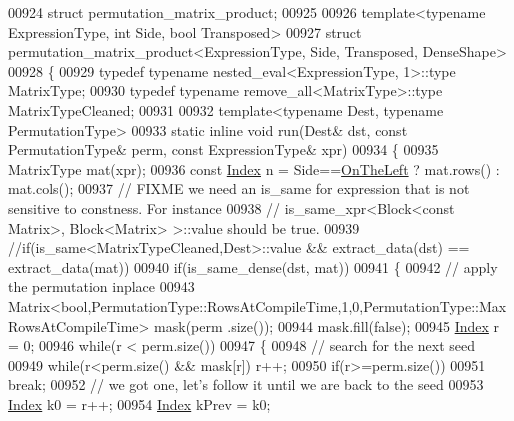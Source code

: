 \begin{DoxyCode}
00924 \textcolor{keyword}{struct }permutation\_matrix\_product;
00925 
00926 \textcolor{keyword}{template}<\textcolor{keyword}{typename} ExpressionType, \textcolor{keywordtype}{int} S\textcolor{keywordtype}{id}e, \textcolor{keywordtype}{bool} Transposed>
00927 \textcolor{keyword}{struct }permutation\_matrix\_product<ExpressionType, Side, Transposed, DenseShape>
00928 \{
00929     \textcolor{keyword}{typedef} \textcolor{keyword}{typename} nested\_eval<ExpressionType, 1>::type MatrixType;
00930     \textcolor{keyword}{typedef} \textcolor{keyword}{typename} remove\_all<MatrixType>::type MatrixTypeCleaned;
00931 
00932     \textcolor{keyword}{template}<\textcolor{keyword}{typename} Dest, \textcolor{keyword}{typename} PermutationType>
00933     \textcolor{keyword}{static} \textcolor{keyword}{inline} \textcolor{keywordtype}{void} run(Dest& dst, \textcolor{keyword}{const} PermutationType& perm, \textcolor{keyword}{const} ExpressionType& xpr)
00934     \{
00935       MatrixType mat(xpr);
00936       \textcolor{keyword}{const} \hyperlink{namespace_eigen_a62e77e0933482dafde8fe197d9a2cfde}{Index} n = Side==\hyperlink{group__enums_ggac22de43beeac7a78b384f99bed5cee0ba129609b3bdf23b071f5f86cf2f995ec4}{OnTheLeft} ? mat.rows() : mat.cols();
00937       \textcolor{comment}{// FIXME we need an is\_same for expression that is not sensitive to constness. For instance}
00938       \textcolor{comment}{// is\_same\_xpr<Block<const Matrix>, Block<Matrix> >::value should be true.}
00939       \textcolor{comment}{//if(is\_same<MatrixTypeCleaned,Dest>::value && extract\_data(dst) == extract\_data(mat))}
00940       \textcolor{keywordflow}{if}(is\_same\_dense(dst, mat))
00941       \{
00942         \textcolor{comment}{// apply the permutation inplace}
00943         Matrix<bool,PermutationType::RowsAtCompileTime,1,0,PermutationType::MaxRowsAtCompileTime> mask(perm
      .size());
00944         mask.fill(\textcolor{keyword}{false});
00945         \hyperlink{namespace_eigen_a62e77e0933482dafde8fe197d9a2cfde}{Index} r = 0;
00946         \textcolor{keywordflow}{while}(r < perm.size())
00947         \{
00948           \textcolor{comment}{// search for the next seed}
00949           \textcolor{keywordflow}{while}(r<perm.size() && mask[r]) r++;
00950           \textcolor{keywordflow}{if}(r>=perm.size())
00951             \textcolor{keywordflow}{break};
00952           \textcolor{comment}{// we got one, let's follow it until we are back to the seed}
00953           \hyperlink{namespace_eigen_a62e77e0933482dafde8fe197d9a2cfde}{Index} k0 = r++;
00954           \hyperlink{namespace_eigen_a62e77e0933482dafde8fe197d9a2cfde}{Index} kPrev = k0;

\end{DoxyCode}
